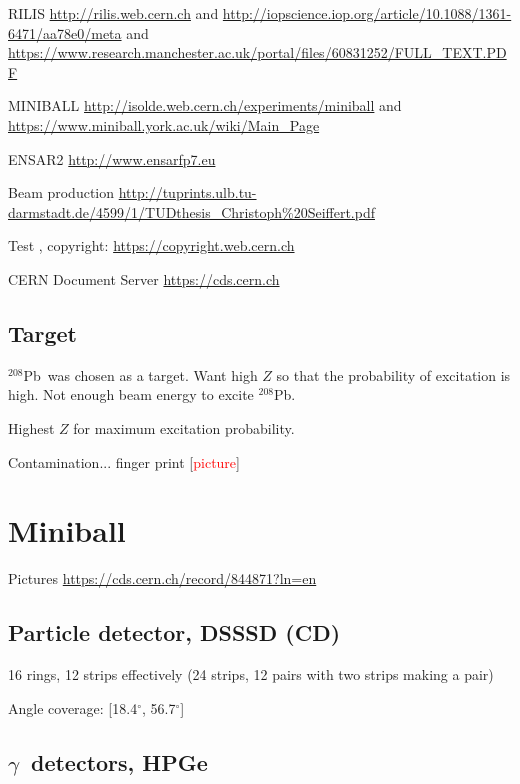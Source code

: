 \documentclass[twoside,english]{uiofysmaster/uiofysmaster}
\newcommand{\Pb}{$^{208}$Pb}
\newcommand{\ga}{$\gamma$}
\begin{document}
\bigskip

RILIS \url{http://rilis.web.cern.ch} and \url{http://iopscience.iop.org/article/10.1088/1361-6471/aa78e0/meta} and \url{https://www.research.manchester.ac.uk/portal/files/60831252/FULL_TEXT.PDF}

\bigskip

MINIBALL \url{http://isolde.web.cern.ch/experiments/miniball} and \url{https://www.miniball.york.ac.uk/wiki/Main_Page}

\bigskip

ENSAR2 \url{http://www.ensarfp7.eu}

\bigskip

Beam production \url{http://tuprints.ulb.tu-darmstadt.de/4599/1/TUDthesis_Christoph%20Seiffert.pdf}

\bigskip

Test \cite{CERN-AC}, copyright: \url{https://copyright.web.cern.ch}

\bigskip

CERN Document Server  \url{https://cds.cern.ch}


\subsection{Target}

\Pb\ was chosen as a target. Want high $Z$ so that the probability of excitation is high. Not enough beam energy to excite \Pb. \newline

Highest $Z$ for maximum excitation probability.


Contamination... finger print [\textcolor{red}{picture}]


\section{Miniball}

Pictures \url{https://cds.cern.ch/record/844871?ln=en}

\subsection{Particle detector, DSSSD (CD)}

16 rings, 12 strips effectively (24 strips, 12 pairs with two strips making a pair)

Angle coverage: [18.4$^\circ$, 56.7$^\circ$]


\subsection{\ga\ detectors, HPGe}
\end{document}

